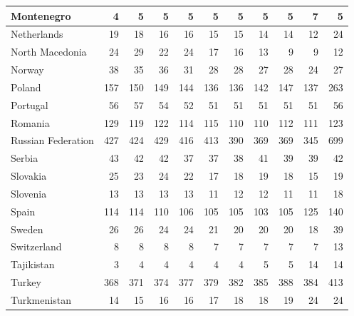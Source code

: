 \begin{table}
\begin{tabular}{|l|r|r|r|r|r|r|r|r|r|r|}
                    Montenegro&      4&      5&      5&      5&      5&      5&      5&      5&      7&      5\\\hline
                   Netherlands&     19&     18&     16&     16&     15&     15&     14&     14&     12&     24\\\hline
               North Macedonia&     24&     29&     22&     24&     17&     16&     13&      9&      9&     12\\\hline
                        Norway&     38&     35&     36&     31&     28&     28&     27&     28&     24&     27\\\hline
                        Poland&    157&    150&    149&    144&    136&    136&    142&    147&    137&    263\\\hline
                      Portugal&     56&     57&     54&     52&     51&     51&     51&     51&     51&     56\\\hline
                       Romania&    129&    119&    122&    114&    115&    110&    110&    112&    111&    123\\\hline
            Russian Federation&    427&    424&    429&    416&    413&    390&    369&    369&    345&    699\\\hline
                        Serbia&     43&     42&     42&     37&     37&     38&     41&     39&     39&     42\\\hline
                      Slovakia&     25&     23&     24&     22&     17&     18&     19&     18&     15&     19\\\hline
                      Slovenia&     13&     13&     13&     13&     11&     12&     12&     11&     11&     18\\\hline
                         Spain&    114&    114&    110&    106&    105&    105&    103&    105&    125&    140\\\hline
                        Sweden&     26&     26&     24&     24&     21&     20&     20&     20&     18&     39\\\hline
                   Switzerland&      8&      8&      8&      8&      7&      7&      7&      7&      7&     13\\\hline
                    Tajikistan&      3&      4&      4&      4&      4&      4&      5&      5&     14&     14\\\hline
                        Turkey&    368&    371&    374&    377&    379&    382&    385&    388&    384&    413\\\hline
                  Turkmenistan&     14&     15&     16&     16&     17&     18&     18&     19&     24&     24\\\hline

\end{tabular}
\end{table}
